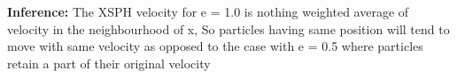 \documentclass[a4paper,11pt]{article}
\begin{document}
\newpage
\newpage
\textbf{Inference:}
\indent The XSPH velocity for e = 1.0 is nothing weighted average of velocity in the neighbourhood of x, So particles having same position will tend to move with same velocity as opposed to the case with e = 0.5 where particles retain a part of their original velocity\\
\end{document}
